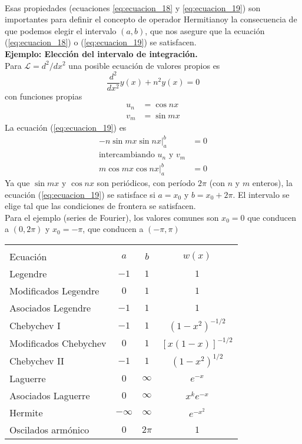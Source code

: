 \\
Esas propiedades (ecuaciones \ref{eq:ecuacion_18} y \ref{eq:ecuacion_19}) son importantes para definir el concepto de operador Hermitianoy la consecuencia de que podemos elegir el intervalo $(a,b)$, que nos asegure que la ecuación (\ref{eq:ecuacion_18}) o (\ref{eq:ecuacion_19}) se satisfacen.
\\
\textbf{Ejemplo: Elección del intervalo de integración.}
\\
Para $\mathscr{L} = d^{2}/dx^{2}$ una posible ecuación de valores propios es
\begin{equation}
\dfrac{d^{2}}{d x^{2}} y(x) + n^{2} y(x) = 0 \label{eq:ecuacion_20}
\end{equation}
con funciones propias
\[ \begin{split}
u_{n} &= \cos nx \\
v_{m} &= \sin mx
\end{split} \]
La ecuación (\ref{eq:ecuacion_19}) es
\begin{eqnarray*}
- n \sin mx \sin nx \vert^{b}_{a} &= 0 \nonumber \\
\text{intercambiando $u_{n}$ y $v_{m}$} \nonumber \\
m \cos mx \cos nx \vert^{b}_{a} &= 0 
\end{eqnarray*}
Ya que $\sin mx$ y $\cos nx$ son periódicos, con período $2 \pi$ (con $n$ y $m$ enteros), la ecuación (\ref{eq:ecuacion_19}) se satisface si $a=x_{0}$ y $b= x_{0} + 2 \pi$. El intervalo se elige tal que las condiciones de frontera se satisfacen.
\\
Para el ejemplo (series de Fourier), los valores comunes son $x_{0}=0$ que conducen a $(0, 2 \pi)$ y $x_{0} = - \pi$, que conducen a $(-\pi, \pi)$
\begin{center}
\begin{tabular}{l c c c}
\hline \\
Ecuación & $a$ & $b$ & $w(x)$ \\ \hline
Legendre & $-1$ & $1$ & $1$ \\ \hline
Modificados Legendre & $0$ & $1$ & $1$ \\ \hline
Asociados Legendre & $-1$ & $1$ & $1$ \\ \hline
Chebychev I & $-1$ & $1$ & $(1-x^{2})^{-1/2}$ \\ \hline
Modificados Chebychev & $0$ & $1$ & $[x(1-x)]^{-1/2}$ \\ \hline
Chebychev II & $-1$ & $1$ & $(1-x^{2})^{1/2}$ \\ \hline
Laguerre & $0$ & $\infty$ & $e^{-x}$ \\ \hline
Asociados Laguerre & $0$ & $\infty$ & $x^{k} e^{-x}$ \\ \hline
Hermite & $-\infty$ & $\infty$ & $e^{-x^{2}}$ \\ \hline
Oscilados armónico & $0$ & $2 \pi$ & $1$ \\ \hline
\end{tabular}
\end{center}
